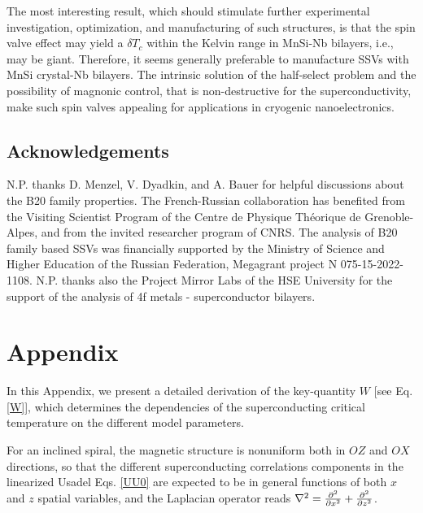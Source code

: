 \documentclass[prb,amsmath,amssymb,reprint]{revtex4-2}
\begin{document}
The most interesting result, which should stimulate further experimental investigation, optimization, and manufacturing of such structures, is that  the spin valve effect  may yield a $\delta T_{c}$ within the Kelvin range in MnSi-Nb bilayers, i.e., may be giant. Therefore, it seems generally preferable to manufacture SSVs with MnSi crystal-Nb bilayers. The intrinsic solution of the half-select problem and the possibility of magnonic control, that is  non-destructive for the superconductivity, make such spin valves appealing for applications in cryogenic nanoelectronics.



\subsection{Acknowledgements}


N.P. thanks D. Menzel, V. Dyadkin, and A. Bauer for helpful discussions about the
B20 family properties. The French-Russian collaboration has benefited from the Visiting Scientist
Program of the Centre de Physique Th\'{e}orique de Grenoble-Alpes, and from the invited researcher program of CNRS.
The analysis of B20 family based SSVs was financially supported by the Ministry of Science and Higher Education of the Russian Federation, Megagrant project N 075-15-2022-1108.
 N.P. thanks also the Project Mirror Labs of the HSE University for the support of the analysis of 4f metals - superconductor bilayers.



\section*{Appendix}

 \label{Appendix}
 In this Appendix, we present a detailed derivation of the key-quantity $W$ [see Eq. \eqref{W}], which determines the dependencies of the superconducting critical temperature on the different model parameters.

For an inclined spiral, the magnetic structure is nonuniform both in $OZ$ and $OX$ directions, so that the different superconducting correlations components in the linearized Usadel Eqs. \eqref{UU0} are expected to be in general functions of both $x$ and $z$ spatial variables, and the
 Laplacian operator reads $
\nabla ^{2}=\frac{\partial ^{2}}{\partial x^{2}}+\frac{\partial ^{2}}{%
\partial z^{2}}$.
\end{document}
